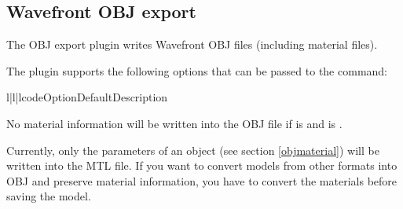 
\subsection{Wavefront OBJ export}

The OBJ export plugin writes Wavefront OBJ files (including material files).

The plugin supports the following options that can be passed to
the  command:

\begin{tableiii}{l|l|l}{code}{Option}{Default}{Description}
\end{tableiii}

No material information will be written into the OBJ file if
 is  and  is .

Currently, only the parameters of an  object (see
section \ref{objmaterial}) will be written into the MTL file.  If you
want to convert models from other formats into OBJ and preserve
material information, you have to convert the materials before saving
the model.

